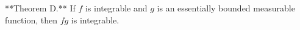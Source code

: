 **Theorem D.** If $f$ is integrable and $g$ is an essentially bounded measurable function, then $fg$ is integrable.
